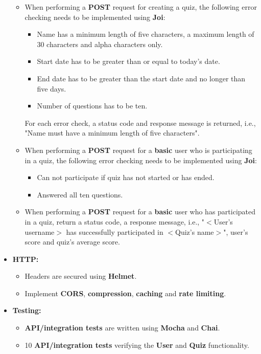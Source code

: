 \documentclass{article}
\begin{document}
\begin{itemize}
\begin{itemize}
		\item When performing a \textbf{POST} request for creating a quiz, the following error checking needs to be implemented using \textbf{Joi}:
		\begin{itemize}
			\item Name has a minimum length of five characters, a maximum length of 30 characters and alpha characters only.
			\item Start date has to be greater than or equal to today's date.
			\item End date has to be greater than the start date and no longer than five days. 
			\item Number of questions has to be ten.
		\end{itemize}
		For each error check, a status code and response message is returned, i.e., "Name must have a minimum length of five characters".
		\item When performing a \textbf{POST} request for a \textbf{basic} user who is participating in a quiz, the following error checking needs to be implemented using \textbf{Joi}:
		\begin{itemize}
			\item Can not participate if quiz has not started or has ended.
			\item Answered all ten questions.
		\end{itemize}
		\item When performing a \textbf{POST} request for a \textbf{basic} user who has participated in a quiz, return a status code, a response message, i.e., "$<$User's username$>$ has successfully participated in $<$Quiz's name$>$", user's score and quiz's average score.
	\end{itemize}
	
	\item \textbf{HTTP:}
	\begin{itemize}
		\item Headers are secured using \textbf{Helmet}.
		\item Implement \textbf{CORS}, \textbf{compression}, \textbf{caching} and \textbf{rate limiting}.
	\end{itemize}
	
	\item \textbf{Testing:}
	\begin{itemize}
		\item \textbf{API/integration tests} are written using \textbf{Mocha} and \textbf{Chai}.
		\item 10 \textbf{API/integration tests} verifying the \textbf{User} and \textbf{Quiz} functionality.
	\end{itemize}


\end{itemize}
\end{document}
